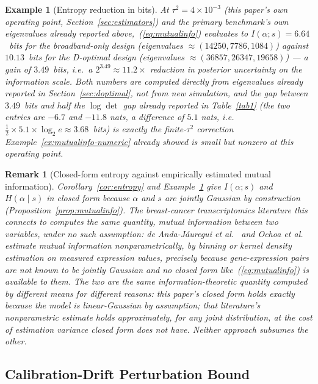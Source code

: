 \documentclass[11pt]{article}
\newtheorem{Remark}{Remark}
\newtheorem{Example}{Example}
\begin{document}
\begin{Example}[Entropy reduction in bits]
\label{ex:entropybits}
At $\tau^2=4\times10^{-3}$ (this paper's own operating point, Section~\ref{sec:estimators}) and the primary benchmark's own eigenvalues already reported above,~(\ref{eq:mutualinfo}) evaluates to $I(\alpha;s)=6.64$~bits for the broadband-only design (eigenvalues $\approx(14250,7786,1084)$) against $10.13$~bits for the D-optimal design (eigenvalues $\approx(36857,26347,19658)$) --- a gain of $3.49$~bits, i.e.\ a $2^{3.49}\approx11.2\times$ reduction in posterior uncertainty on the information scale. Both numbers are computed directly from eigenvalues already reported in Section~\ref{sec:doptimal}, not from new simulation, and the gap between $3.49$~bits and half the $\log\det$ gap already reported in Table~\ref{tab1} (the two entries are $-6.7$ and $-11.8$ nats, a difference of $5.1$ nats, i.e.\ $\tfrac12\times5.1\times\log_2e\approx3.68$~bits) is exactly the finite-$\tau^2$ correction Example~\ref{ex:mutualinfo-numeric} already showed is small but nonzero at this operating point.
\end{Example}

\begin{Remark}[Closed-form entropy against empirically estimated mutual information]
\label{rmk:entropycontrast}
Corollary~\ref{cor:entropy} and Example~\ref{ex:entropybits} give $I(\alpha;s)$ and $H(\alpha\mid s)$ in closed form because $\alpha$ and $s$ are jointly Gaussian by construction (Proposition~\ref{prop:mutualinfo}). The breast-cancer transcriptomics literature this connects to computes the same quantity, mutual information between two variables, under no such assumption: de Anda-J\'{a}uregui et al.~\citep{ref29} and Ochoa et al.~\citep{ref49} estimate mutual information nonparametrically, by binning or kernel density estimation on measured expression values, precisely because gene-expression pairs are not known to be jointly Gaussian and no closed form like~(\ref{eq:mutualinfo}) is available to them. The two are the same information-theoretic quantity computed by different means for different reasons: this paper's closed form holds exactly because the model is linear-Gaussian by assumption; that literature's nonparametric estimate holds approximately, for any joint distribution, at the cost of estimation variance closed form does not have. Neither approach subsumes the other.
\end{Remark}

\subsection{Calibration-Drift Perturbation Bound}
\label{sec:drift}
\end{document}
